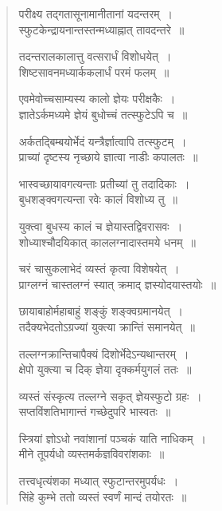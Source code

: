 \documentclass[11pt, openany]{book}
\begin{document}
\newpage

\begin{quote}
{\qt परीक्ष्य तद्गतासूनामानीतानां यदन्तरम्~।\\
स्फुटकेन्द्रायनान्तस्तन्मध्याह्नात् तावदन्तरे~॥

तदन्तरालकालात्तु वत्सरार्धं विशोधयेत्~।\\
शिष्टसावनमध्यार्ककलार्धं परमं फलम्~॥

एवमेवोच्चसाम्यस्य कालो ज्ञेयः परीक्षकैः~।\\
ज्ञातेऽर्कमध्यमे ज्ञेयं बुधोच्चं तत्स्फुटेऽपि च~॥

अर्कतद्बिम्बयोर्भेदं यन्त्रैर्ज्ञात्वापि तत्स्फुटम्~।\\
प्राच्यां दृष्टस्य नृच्छाये ज्ञात्वा नाडीः कपालतः~॥

भास्वच्छायावगत्यन्ताः प्रतीच्यां तु तदादिकाः~।\\
बुधशङ्क्वगत्यन्ता रवेः कालं विशोध्य तु~॥

युक्त्वा बुधस्य कालं च ज्ञेयास्तद्विवरासवः~।\\
शोध्याश्चौदयिकात् काललग्नादास्तमये धनम्~॥

चरं चासुकलाभेदं व्यस्तं कृत्वा विशेषयेत्~।\\
प्राग्लग्नं चास्तलग्नं स्यात् क्रमाद् ज्ञस्योदयास्तयोः~॥

छायाबाहोर्महाबाहुं शङ्कुं शङ्क्वग्रमानयेत्~।\\
तदैक्यभेदतोऽग्रज्यां युक्त्या क्रान्तिं समानयेत्~॥

तल्लग्नक्रान्तिचापैक्यं दिशोर्भेदेऽन्यथान्तरम्~।\\
क्षेपो युक्त्या च दिक् ज्ञेया दृक्कर्मयुगलं ततः~॥

व्यस्तं संस्कृत्य तल्लग्ने सकृत् ज्ञेयस्फुटो ग्रहः~।\\
सप्तविंशतिभागान्तं गच्छेदुपरि भास्वतः~॥

स्त्रियां ज्ञोऽधो नवांशानां पञ्चकं याति नाधिकम्~।\\
मीने तूपर्यधो व्यस्तमर्कज्ञविवरांशकाः~॥

तत्त्वधृत्यंशका मध्यात् स्फुटान्तरमुपर्यधः~।\\
सिंहे कुम्भे ततो व्यस्तं स्वर्णं मान्दं तयोरतः~॥}
\end{quote}
 
\newpage
\end{document}
